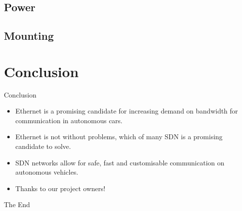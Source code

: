 \documentclass{beamer}
\begin{document}
\subsection{Power}
\subsection{Mounting}


\section{Conclusion}
\begin{frame}{Conclusion}
    \begin{itemize}
        \item Ethernet is a promising candidate for increasing demand on bandwidth for communication in autonomous cars.
        \item Ethernet is not without problems, which of many SDN is a promising candidate to solve.
        \item SDN networks allow for safe, fast and customisable communication on autonomous vehicles.
        \item Thanks to our project owners! 
    \end{itemize}
    
\end{frame}






\begin{frame}
\Huge{\centerline{The End}}
\end{frame}

\end{document}
